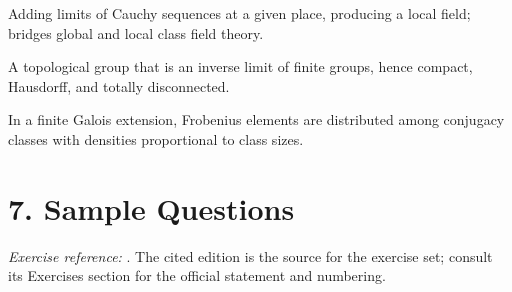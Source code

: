 \begin{description}[leftmargin=*,style=nextline,itemsep=0.3em]
\item[\textbf{Completion.}] Adding limits of Cauchy sequences at a given place, producing a local field; bridges global and local class field theory.

\item[\textbf{Profinite group.}] A topological group that is an inverse limit of finite groups, hence compact, Hausdorff, and totally disconnected.

\item[\textbf{Chebotarev density theorem.}] In a finite Galois extension, Frobenius elements are distributed among conjugacy classes with densities proportional to class sizes.

\end{description}

\section*{7. Sample Questions}
\emph{Exercise reference:} \cite{class_field_theory_ref1}. The cited edition is the source for the exercise set; consult its Exercises section for the official statement and numbering.
